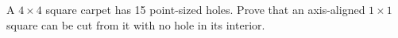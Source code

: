A $4\times4$ square carpet has 15 point-sized holes. Prove that an axis-aligned $1\times1$ square can be cut from it with no hole in its interior.
